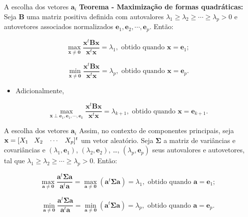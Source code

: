 \documentclass[
  ignorenonframetext,
  aspectratio=169,
]{beamer}
\providecommand{\tightlist}{%
  \setlength{\itemsep}{0pt}\setlength{\parskip}{0pt}}
\begin{document}
\begin{frame}{A escolha dos vetores \(\boldsymbol{a}_i\)}
\label{a-escolha-dos-vetores-boldsymbola_i-1}
\textbf{Teorema - Maximização de formas quadráticas:} Seja
\(\boldsymbol{B}\) uma matriz positiva definida com autovalores
\(\lambda_1 \geqslant \lambda_2 \geqslant \cdots \geqslant \lambda_p > 0\)
e autovetores associados normalizados
\({\boldsymbol{e}_1, \boldsymbol{e}_2, \cdots, \boldsymbol{e}_p}\).
Então:

\[\max_{\mathbf{x} \neq \boldsymbol{0}} \dfrac{\mathbf{x}^t \boldsymbol{B} \mathbf{x}}{\mathbf{x}^t \mathbf{x}} =  \lambda_1, \text{ obtido quando } \mathbf{x} = \boldsymbol{e}_1;\]

\[\min_{\mathbf{x} \neq \boldsymbol{0}} \dfrac{\mathbf{x}^t \boldsymbol{B} \mathbf{x}}{\mathbf{x}^t \mathbf{x}} =  \lambda_p, \text{ obtido quando } \mathbf{x} = \boldsymbol{e}_p.\]

\pause

\begin{itemize}
\tightlist
\item
  Adicionalmente,
\end{itemize}

\[\max_{\mathbf{x} \perp \boldsymbol{e}_1, \boldsymbol{e}_1, \cdots, \boldsymbol{e}_k} \dfrac{\mathbf{x}^t \boldsymbol{B} \mathbf{x}}{\mathbf{x}^t \mathbf{x}} =  \lambda_{k+1}, \text{ obtido quando } \mathbf{x} = \boldsymbol{e}_{k+1}.\]
\end{frame}

\begin{frame}{A escolha dos vetores \(\boldsymbol{a}_i\)}
\label{a-escolha-dos-vetores-boldsymbola_i-2}
Assim, no contexto de componentes principais, seja
\(\mathbf{x} = [X_1 \hspace{0.3cm} X_2 \hspace{0.3cm} \cdots \hspace{0.3cm} X_p]^t\)
um vetor aleatório. Seja \(\boldsymbol{\Sigma}\) a matriz de variâncias
e covariâncias e \((\lambda_1, \boldsymbol{e}_1)\),
\((\lambda_2, \boldsymbol{e}_2)\), \ldots,
\((\lambda_p, \boldsymbol{e}_p)\) seus autovalores e autovetores, tal
que
\(\lambda_1 \geqslant \lambda_2 \geqslant \cdots \geqslant \lambda_p > 0\).
Então:

\[\max_{\boldsymbol{a} \neq \boldsymbol{0}} \dfrac{\boldsymbol{a}^t \boldsymbol{\Sigma} \boldsymbol{a}}{\boldsymbol{a}^t \boldsymbol{a}} = \max_{\boldsymbol{a} \neq \boldsymbol{0}}(\boldsymbol{a}^t \boldsymbol{\Sigma} \boldsymbol{a}) = \lambda_1, \text{ obtido quando } \boldsymbol{a} = \boldsymbol{e}_1;\]

\[\min_{\boldsymbol{a} \neq \boldsymbol{0}} \dfrac{\boldsymbol{a}^t \boldsymbol{\Sigma} \boldsymbol{a}}{\boldsymbol{a}^t \boldsymbol{a}} = \min_{\boldsymbol{a} \neq \boldsymbol{0}}(\boldsymbol{a}^t \boldsymbol{\Sigma} \boldsymbol{a}) = \lambda_p, \text{ obtido quando } \boldsymbol{a} = \boldsymbol{e}_p.\]
\end{frame}
\end{document}
